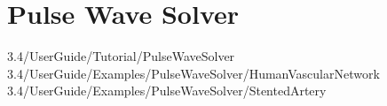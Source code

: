 \section{Pulse Wave Solver}

3.4/UserGuide/Tutorial/PulseWaveSolver
3.4/UserGuide/Examples/PulseWaveSolver/HumanVascularNetwork
3.4/UserGuide/Examples/PulseWaveSolver/StentedArtery
